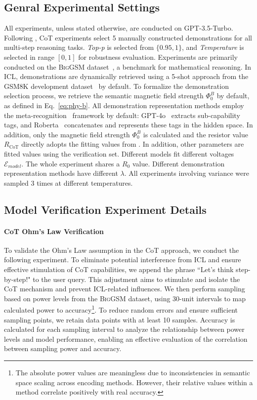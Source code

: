 \subsection{Genral Experimental Settings}
All experiments, unless stated otherwise, are conducted on GPT-3.5-Turbo. Following \citet{wei2022chain}, CoT experiments select 5 manually constructed demonstrations for all multi-step reasoning tasks. \textit{Top-p} is selected from $\{0.95, 1\}$, and \textit{Temperature} is selected in range \([0, 1]\) for robustness evaluation.
Experiments are primarily conducted on the \textsc{BigGSM} dataset~\citep{chen2024unlocking}, a benchmark for mathematical reasoning. 
In ICL, demonstrations are dynamically retrieved using a 5-shot approach from the GSM8K development dataset~\citep{cobbe2021training} by default. To formalize the demonstration selection process, we retrieve the semantic magnetic field strength \(\Phi^B_0\) by default, as defined in Eq.~\ref{eq:phy-b}. All demonstration representation methods employ the meta-recognition~\cite{didolkar2024metacognitive} framework by default: GPT-4o~\cite{achiam2023gpt} extracts sub-capability tags, and Roberta~\cite{liu2019roberta} concatenates and represents these tags in the hidden space. In addition, only the magnetic field strength $\Phi^B_0$ is calculated and the resistor value $R_{\text{CoT}}$ directly adopts the fitting values from \citet{chen2024unlocking}. In addition, other parameters are fitted values using the verification set. Different models fit different voltages $\mathcal{E}_{model}$. The whole experiment shares a $R_0$ value. Different demonstration representation methods have different $\lambda$. All experiments involving variance were sampled 3 times at different temperatures.

\subsection{Model Verification Experiment Details}

\paragraph{CoT Ohm's Law Verification}
To validate the Ohm's Law assumption in the CoT approach, we conduct the following experiment. To eliminate potential interference from ICL and ensure effective stimulation of CoT capabilities, we append the phrase ``Let's think step-by-step!" to the user query. This adjustment aims to stimulate and isolate the CoT mechanism and prevent ICL-related influences.
We then perform sampling based on power levels from the \textsc{BigGSM} dataset, using 30-unit intervals to map calculated power to accuracy\footnote{The absolute power values are meaningless due to inconsistencies in semantic space scaling across encoding methods. However, their relative values within a method correlate positively with real accuracy.}. To reduce random errors and ensure sufficient sampling points, we retain data points with at least 10 samples. Accuracy is calculated for each sampling interval to analyze the relationship between power levels and model performance, enabling an effective evaluation of the correlation between sampling power and accuracy. 

